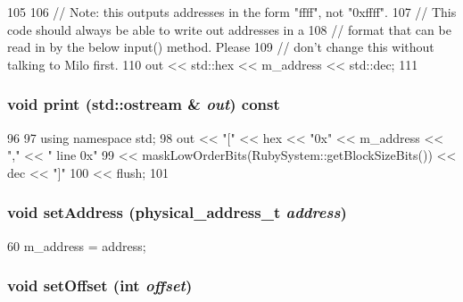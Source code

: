 \begin{DoxyCode}
105 {
106     // Note: this outputs addresses in the form "ffff", not "0xffff".
107     // This code should always be able to write out addresses in a
108     // format that can be read in by the below input() method.  Please
109     // don't change this without talking to Milo first.
110     out << std::hex << m_address << std::dec;
111 }
\end{DoxyCode}
\hypertarget{classAddress_ac55fe386a101fbae38c716067c9966a0}{
\subsubsection[{print}]{\setlength{\rightskip}{0pt plus 5cm}void print (std::ostream \& {\em out}) const}}
\label{classAddress_ac55fe386a101fbae38c716067c9966a0}



\begin{DoxyCode}
96 {
97     using namespace std;
98     out << "[" << hex << "0x" << m_address << "," << " line 0x"
99         << maskLowOrderBits(RubySystem::getBlockSizeBits()) << dec << "]"
100         << flush;
101 }
\end{DoxyCode}
\hypertarget{classAddress_a8febae9cef6a5c73aee5c73af61afc48}{
\subsubsection[{setAddress}]{\setlength{\rightskip}{0pt plus 5cm}void setAddress ({\bf physical\_\-address\_\-t} {\em address})}}
\label{classAddress_a8febae9cef6a5c73aee5c73af61afc48}



\begin{DoxyCode}
60 { m_address = address; }
\end{DoxyCode}
\hypertarget{classAddress_a360f28b444fb8f8ee6db216f80a54248}{
\subsubsection[{setOffset}]{\setlength{\rightskip}{0pt plus 5cm}void setOffset (int {\em offset})}}
\label{classAddress_a360f28b444fb8f8ee6db216f80a54248}



